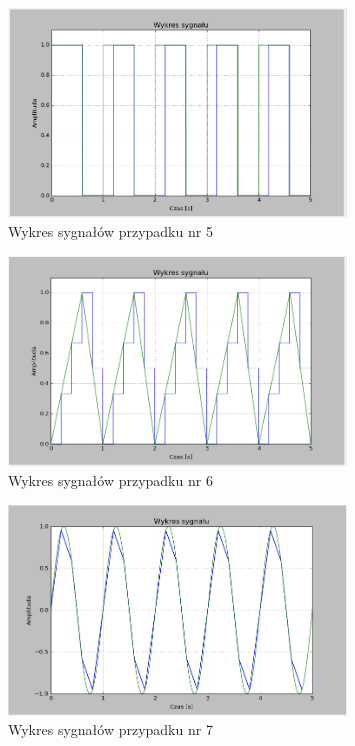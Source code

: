 \documentclass{article}
\begin{document}
    \begin{figure}[h!]
        \centering
        \includegraphics[width=0.8\textwidth]{img/1/zoh_rec.png}
        \caption{Wykres sygnałów przypadku nr 5}
    \end{figure}
    \FloatBarrier

    \begin{figure}[h!]
        \centering
        \includegraphics[width=0.8\textwidth]{img/1/zoh_tri.png}
        \caption{Wykres sygnałów przypadku nr 6}
    \end{figure}
    \FloatBarrier

    \begin{figure}[h!]
        \centering
        \includegraphics[width=0.8\textwidth]{img/1/foh5.png}
        \caption{Wykres sygnałów przypadku nr 7}
    \end{figure}
    \FloatBarrier
\end{document}
